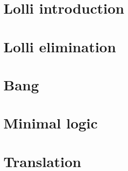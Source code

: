 \documentclass{book}  %
\theoremstyle{definition}
\theoremstyle{plain}
\theoremstyle{remark}
\numberwithin{section}{chapter}
\numberwithin{equation}{chapter}
\begin{document}








\part{Lolli introduction}








\part{Lolli elimination}









\part{Bang}







\part{Minimal logic}






\part{Translation}
\end{document}
